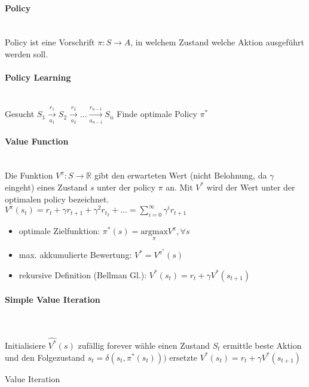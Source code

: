 \paragraph{Policy} \mbox{} \\
Policy ist eine Vorschrift $\pi: S \rightarrow A$, in welchem Zustand welche Aktion
ausgeführt werden soll.
\paragraph{Policy Learning} \mbox{} \\
Gesucht $S_{1} \xrightarrow[a_1]{r_1}S_{2}\xrightarrow[a_2]{r_2}\dots \xrightarrow[a_{n-1}]{r_{n-1}}S_n$
Finde optimale Policy $\pi^{*}$
\paragraph{Value Function} \mbox{} \\
Die Funktion $V^{\pi}:S\rightarrow \mathbb{R}$ gibt den erwarteten Wert (nicht Belohnung, da $\gamma$ eingeht)
eines Zustand $s$ unter der policy $\pi$ an. Mit $V^{*}$ wird der Wert unter der
optimalen policy bezeichnet. \\
$V^{\pi}(s_t) = r_t + {\gamma} r_{t+1} + {\gamma}^2 r_{t_2} + \dots = \sum\limits_{i=0}^{\infty} \gamma^i r_{t+1}$
\begin{itemize}
    \item optimale Zielfunktion: $\pi^{*}(s) = \underset{\pi}{\mathrm{argmax}} V^{\pi}, \forall s$
    \item max. akkumulierte Bewertung: $V^{*} = V^{\pi^{*}}(s)$
    \item rekursive Definition (Bellman Gl.): $V^{*}(s_t) = r_t + \gamma V^{*}(s_{t+1})$
\end{itemize}

\paragraph{Simple Value Iteration} \mbox{} \\
\begin{algorithm}[H]
    \begin{algorithmic}
        \State Initialisiere $\hat{V^{*}}(s)$ zufällig
        \While{} forever
            \State wähle einen Zustand $S_t$
            \State ermittle beste Aktion und den Folgezustand
            \State $s_t = \delta(s_t,\pi^{*}(s_t)))$
            \State ersetzte
            \State $V^{*}(s_t) = r_t + \gamma V^{*}(s_{t+1})$
            \EndWhile
    \caption{Value Iteration}
    \end{algorithmic}
\end{algorithm}

